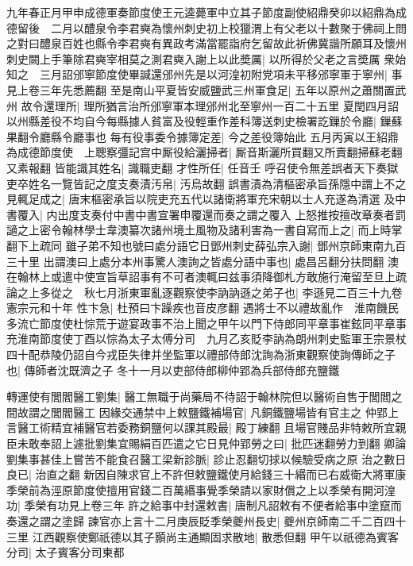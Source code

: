 九年春正月甲申成德軍奏節度使王元逵薨軍中立其子節度副使紹鼎癸卯以紹鼎為成德留後　二月以醴泉令李君奭為懷州刺史初上校獵渭上有父老以十數聚于佛祠上問之對曰醴泉百姓也縣令李君奭有異政考滿當罷詣府乞留故此祈佛冀諧所願耳及懷州刺史闕上手筆除君奭宰相莫之測君奭入謝上以此奬厲|{
	以所得於父老之言奬厲}
衆始知之　三月詔邠寧節度使畢諴還邠州先是以河湟初附党項未平移邠寧軍于寧州|{
	事見上卷三年先悉薦翻}
至是南山平夏皆安威鹽武三州軍食足|{
	五年以原州之蕭關置武州}
故令還理所|{
	理所猶言治所邠寧軍本理邠州北至寧州一百二十五里}
夏閏四月詔以州縣差役不均自今每縣據人貧富及役輕重作差科簿送刺史檢署訖鏁於令廳|{
	鏁蘇果翻令廳縣令廳事也}
每有役事委令據簿定差|{
	今之差役簿始此}
五月丙寅以王紹鼎為成德節度使　上聰察彊記宫中厮役給灑掃者|{
	厮音斯灑所買翻又所賣翻掃蘇老翻又素報翻}
皆能識其姓名|{
	識職吏翻}
才性所任|{
	任音壬}
呼召使令無差誤者天下奏獄吏卒姓名一覽皆記之度支奏漬汚帛|{
	汚烏故翻}
誤書漬為清樞密承旨孫隱中謂上不之見輒足成之|{
	唐末樞密承旨以院吏充五代以諸衛將軍充宋朝以士人充遂為清選}
及中書覆入|{
	内出度支奏付中書中書宣署申覆還而奏之謂之覆入}
上怒推按擅改章奏者罰讁之上密令翰林學士韋澳纂次諸州境土風物及諸利害為一書自寫而上之|{
	而上時掌翻下上疏同}
雖子弟不知也號曰處分語它日鄧州刺史薛弘宗入謝|{
	鄧州京師東南九百三十里}
出謂澳曰上處分本州事驚人澳詢之皆處分語中事也|{
	處昌呂翻分扶問翻}
澳在翰林上或遣中使宣旨草詔事有不可者澳輒曰兹事須降御札方敢施行淹留至旦上疏論之上多從之　秋七月浙東軍亂逐觀察使李訥訥遜之弟子也|{
	李遜見二百三十九卷憲宗元和十年}
性卞急|{
	杜預曰卞躁疾也音皮彦翻}
遇將士不以禮故亂作　淮南饑民多流亡節度使杜悰荒于遊宴政事不治上聞之甲午以門下侍郎同平章事崔鉉同平章事充淮南節度使丁酉以悰為太子太傅分司　九月乙亥貶李訥為朗州刺史監軍王宗景杖四十配恭陵仍詔自今戎臣失律并坐監軍以禮部侍郎沈詢為浙東觀察使詢傳師之子也|{
	傳師者沈既濟之子}
冬十一月以吏部侍郎柳仲郢為兵部侍郎充鹽鐵

轉運使有閭閻醫工劉集|{
	醫工無職于尚藥局不待詔于翰林院但以醫術自售于閭閻之間故謂之閭閻醫工}
因緣交通禁中上敕鹽鐵補場官|{
	凡銅鐵鹽場皆有官主之}
仲郢上言醫工術精宜補醫官若委務銅鹽何以課其殿最|{
	殿丁練翻}
且場官賤品非特敕所宜親臣未敢奉詔上遽批劉集宜賜絹百匹遣之它日見仲郢勞之曰|{
	批匹迷翻勞力到翻}
卿論劉集事甚佳上嘗苦不能食召醫工梁新診脈|{
	診止忍翻切捄以候驗受病之原}
治之數日良已|{
	治直之翻}
新因自陳求官上不許但敕鹽鐵使月給錢三十緡而已右威衛大將軍康季榮前為涇原節度使擅用官錢二百萬緡事覺季榮請以家財償之上以季榮有開河湟功|{
	季榮有功見上卷三年}
許之給事中封還敕書|{
	唐制凡詔敕有不便者給事中塗竄而奏還之謂之塗歸}
諫官亦上言十二月庚辰貶季榮夔州長史|{
	夔州京師南二千二百四十三里}
江西觀察使鄭祇德以其子顥尚主通顯固求散地|{
	散悉但翻}
甲午以祇德為賓客分司|{
	太子賓客分司東都}


